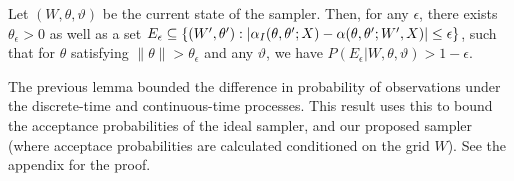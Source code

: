 \begin{proposition}
  Let $(W, \theta, \vartheta)$ be the current state of the sampler.
Then, for any $\epsilon$, there exists $\theta_\epsilon > 0$ as well as a set $E_\epsilon \subseteq \{(W', \theta'): |\alpha_I(\theta,\theta';X) - \alpha(\theta,\theta';W',X)| \le \epsilon\}$, such that for $\theta$ satisfying $\| \theta \| > \theta_\epsilon$ and any $\vartheta$, we have
$P(E_\epsilon|W,\theta,\vartheta) > 1-\epsilon$.
\label{prop:mix0}
\end{proposition}
\noindent The previous lemma bounded the difference in probability of observations 
under the discrete-time and continuous-time processes. This result 
uses this to bound the acceptance probabilities of the ideal sampler, 
and our proposed sampler (where acceptace probabilities are calculated 
conditioned on the grid $W$). See the appendix for the proof.


